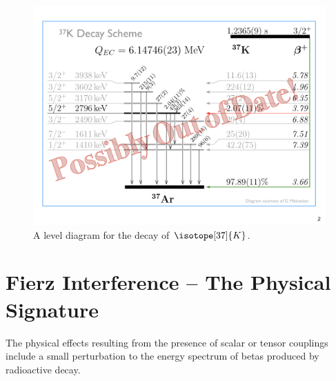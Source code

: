 \begin{figure}[h!!t]
	\centering
	\includegraphics[width=.999\linewidth]
	{Figures/NuclearLevelDiagram_prelim}
	\caption{A level diagram for the decay of $\isotope[37]{K}$.}	
	\label{fig:nuclearleveldiagram}
\end{figure}



\section{Fierz Interference -- The Physical Signature}
	The physical effects resulting from the presence of scalar or tensor couplings include a small perturbation to the energy spectrum of betas produced by radioactive decay.  



